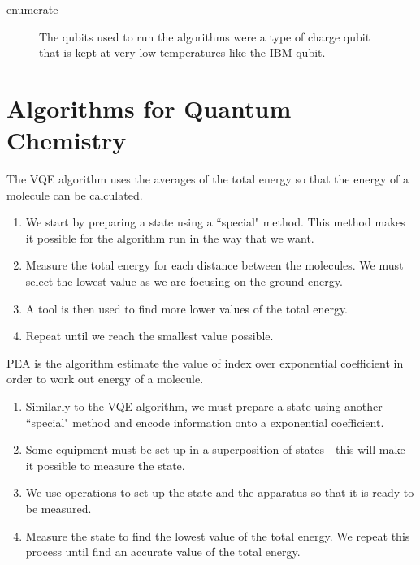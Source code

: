 enumerate\documentclass[14pt,landscape,color=UCLdarkred,margin=3cm]{uclposter}
\begin{document}
\begin{multicols}{3}
\begin{figure}[H]
\begin{center}
\begin{minipage}[c]{9em}
  \end{minipage}
  \qquad
  \begin{minipage}[c]{20em}

The qubits used to run the algorithms were a type of charge qubit that is kept at very low temperatures like the IBM qubit.

  \end{minipage}
  \end{center}

   
\end{figure}

\section*{Algorithms for Quantum Chemistry}

The VQE algorithm uses the averages of the total energy so that the energy of a molecule can be calculated.

\begin{highlightbox}
  \begin{enumerate}
\item We start by preparing a state using a ``special" method. This method makes it possible for the algorithm run in the way that we want.
\item Measure the total energy for each distance between the molecules. We must select the lowest value as we are focusing on the ground energy.
\item A tool is then used to find more lower values of the total energy.
\item Repeat until we reach the smallest value possible.
\end{enumerate}
\end{highlightbox}

PEA is the algorithm estimate the value of index over exponential coefficient in order to work out energy of a molecule.


\begin{highlightbox}
\begin{enumerate}
\item Similarly to the VQE algorithm, we must prepare a state using another ``special" method and encode information onto a exponential coefficient. 
\item Some equipment must be set up in a superposition of states - this will make it possible to measure the state.
\item We use operations to set up the state and the apparatus so that it is ready to be measured. 
\item Measure the state to find the lowest value of the total energy. We repeat this process until find an accurate value of the total energy.
\end{enumerate}
\end{highlightbox}




\end{multicols}
\end{document}
